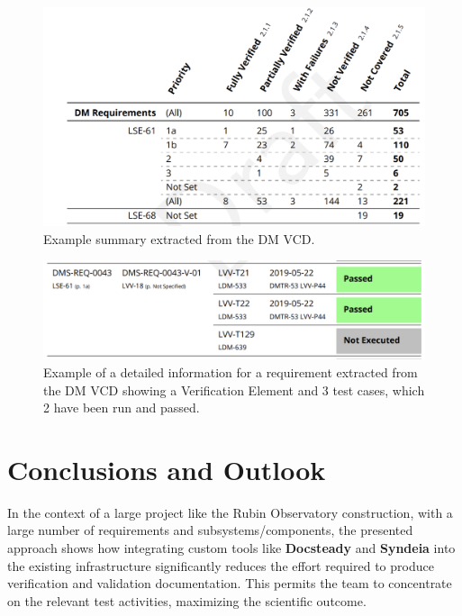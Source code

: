 \begin{figure}
\begin{center}
\includegraphics[width=\textwidth]{imgs/VCDsumm.png}
 \caption{Example summary extracted from the DM VCD.}
 \label{fig:vcdsum}
\end{center}
\end{figure}

\begin{figure}
\begin{center}
\includegraphics[width=\textwidth]{imgs/VCDdetail.png}
 \caption{Example of a detailed information for a requirement extracted from the DM VCD 
 showing a Verification Element and 3 test cases, which 2 have been run and passed.}
 \label{fig:vcddetail}
\end{center}
\end{figure}
\section{Conclusions and Outlook}

In the context of a large project like the Rubin Observatory construction, with a large number of requirements
and subsystems/components, the presented approach shows how integrating custom tools like \textbf{Docsteady}
and \textbf{Syndeia} into the existing infrastructure significantly reduces the effort
required to produce verification and validation documentation.
This permits the team to concentrate on the relevant test activities, maximizing the scientific outcome.

